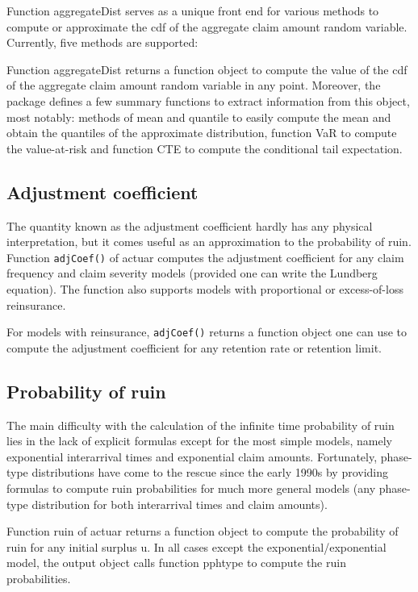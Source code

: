 \documentclass[12pt]{article}
\begin{document}
Function aggregateDist serves as a unique front end for various methods to compute or approximate the cdf of the aggregate claim amount random variable. Currently, five methods are supported:

Function aggregateDist returns a function object to compute the value of the cdf of the aggregate claim amount random variable in any point. Moreover, the package defines a few summary functions to extract information from this object, most notably: methods of mean and quantile to easily compute the mean and obtain the quantiles of the approximate distribution, function VaR to compute the value-at-risk and function CTE to compute the conditional tail expectation.

\subsection{Adjustment coefficient}

The quantity known as the adjustment coefficient hardly has any physical interpretation, but it comes useful as an approximation to the probability of ruin. Function \texttt{adjCoef()} of actuar computes the adjustment coefficient for any claim frequency and claim severity models (provided one can write the Lundberg equation). The function also supports models with proportional or excess-of-loss reinsurance.

For models with reinsurance, \texttt{adjCoef()} returns a function object one can use to compute the adjustment coefficient for any retention rate or retention limit.

\subsection{Probability of ruin}

The main difficulty with the calculation of the infinite time probability of ruin lies in the lack of explicit formulas except for the most simple models, namely exponential interarrival times and exponential claim amounts. Fortunately, phase-type distributions have come to the rescue since the early 1990s by providing formulas to compute ruin probabilities for much more general models (any phase-type distribution for both interarrival times and claim amounts).

Function ruin of actuar returns a function object to compute the probability of ruin for any initial surplus u. In all cases except the exponential/exponential model, the output object calls function pphtype to compute the ruin probabilities.
\end{document}
